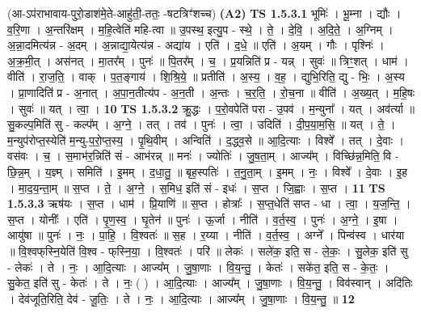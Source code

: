 \documentclass[17pt]{extarticle}
\begin{document}
                  \newline
                      (आ-ऽप॑राभावाय-पुरो॒डाश॑मे॒ते-आहु॑ती॒-ततः॒ -षटत्रिꣳ॑शच्च)  \textbf{(A2)} \newline \newline
                                \textbf{ TS 1.5.3.1} \newline
                  भूमिः॑ । भू॒म्ना । द्यौः । व॒रि॒णा । अ॒न्तरि॑क्षम् । म॒हि॒त्वेति॑ महि-त्वा ॥ उ॒पस्थ॒ इत्यु॒प - स्थे॒ । ते॒ । दे॒वि॒ । अ॒दि॒ते॒ । अ॒ग्निम् । अ॒न्ना॒दमित्य॑न्न - अ॒दम् । अ॒न्नाद्या॒येत्य॑न्न - अद्या॑य । एति॑ । द॒धे॒ ॥ एति॑ । अ॒यम् । गौः । पृश्निः॑ । अ॒क्र॒मी॒त् । अस॑नत् । मा॒तर᳚म् । पुनः॑ ॥ पि॒तर᳚म् । च॒ । प्र॒यन्निति॑ प्र - यन्न् । सुवः॑ ॥ त्रिꣳ॒॒शत् । धाम॑ । वीति॑ । रा॒ज॒ति॒ । वाक् । प॒त॒ङ्गाय॑ । शि॒श्रि॒ये॒ ॥ प्रतीति॑ । अ॒स्य॒ । व॒ह॒ । द्युभि॒रिति॒ द्यु - भिः॒ । अ॒स्य । प्रा॒णादिति॑ प्र - अ॒नात् । अ॒पा॒न॒तीत्य॑प - अ॒न॒ती । अ॒न्तः । च॒र॒ति॒ । रो॒च॒ना ॥ वीति॑ । अ॒ख्य॒त् । म॒हि॒षः । सुवः॑ ॥ यत् । त्वा॒ । \textbf{  10} \newline
                  \newline
                                \textbf{ TS 1.5.3.2} \newline
                  क्रु॒द्धः । प॒रो॒वपेति॑ परा - उ॒पव॑ । म॒न्युना᳚ । यत् । अव॑र्त्या ॥ सु॒कल्प॒मिति॑ सु - कल्प᳚म् । अ॒ग्ने॒ । तत् । तव॑ । पुनः॑ । त्वा॒ । उदिति॑ । दी॒प॒या॒म॒सि॒ ॥ यत् । ते॒ । म॒न्युप॑रोप्त॒स्येति॑ म॒न्यु-प॒रो॒प्त॒स्य॒ । पृ॒थि॒वीम् । अन्विति॑ । द॒द्ध्व॒से ॥ आ॒दि॒त्याः । विश्वे᳚ । तत् । दे॒वाः । वस॑वः । च॒ । स॒माभ॑र॒न्निति॑ सं - आभ॑रन्न् ॥ मनः॑ । ज्योतिः॑ । जु॒ष॒ता॒म् । आज्य᳚म् । विच्छि॑न्न॒मिति॒ वि - छि॒न्न॒म् । य॒ज्ञ्म् । समिति॑ । इ॒मम् । द॒धा॒तु॒ ॥ बृह॒स्पतिः॑ । त॒नु॒ता॒म् । इ॒मम् । नः॒ । विश्वे᳚ । दे॒वाः । इ॒ह । मा॒द॒य॒न्ता॒म् ॥ स॒प्त । ते॒ । अ॒ग्ने॒ । स॒मिध॒ इति॑ सं - इधः॑ । स॒प्त । जि॒ह्वाः । स॒प्त । \textbf{  11} \newline
                  \newline
                                \textbf{ TS 1.5.3.3} \newline
                  ऋष॑यः । स॒प्त । धाम॑ । प्रि॒याणि॑ ॥ स॒प्त । होत्राः᳚ । स॒प्त॒धेति॑ सप्त - धा । त्वा॒ । य॒ज॒न्ति॒ । स॒प्त । योनीः᳚ । एति॑ । पृ॒ण॒स्व॒ । घृ॒तेन॑ ॥ पुनः॑ । ऊ॒र्जा । नीति॑ । व॒र्त॒स्व॒ । पुनः॑ । अ॒ग्ने॒ । इ॒षा । आयु॑षा ॥ पुनः॑ । नः॒ । पा॒हि॒ । वि॒श्वतः॑ ॥ स॒ह । र॒य्या । नीति॑ । व॒र्त॒स्व॒ । अग्ने᳚ । पिन्व॑स्व । धार॑या ॥ वि॒श्वफ्‌स्नि॒येति॑ वि॒श्व - फ्‌स्नि॒या॒ । वि॒श्वतः॑ । परि॑ ॥ लेकः॑ । सले॑क॒ इति॒ स - ले॒कः॒ । सु॒लेक॒ इति॑ सु - लेकः॑ । ते । नः॒ । आ॒दि॒त्याः । आज्य᳚म् । जु॒षा॒णाः । वि॒य॒न्तु॒ । केतः॑ । सके॑त॒ इति॒ स - के॒तः॒ । सु॒केत॒ इति॑ सु - केतः॑ । ते । नः॒ ( ) । आ॒दि॒त्याः । आज्य᳚म् । जु॒षा॒णाः । वि॒य॒न्तु॒ । विव॑स्वान् । अदि॑तिः । देव॑जूति॒रिति॒ देव॑ - जू॒तिः॒ । ते । नः॒ । आ॒दि॒त्याः । आज्य᳚म् । जु॒षा॒णाः । वि॒य॒न्तु॒ ॥ \textbf{  12} \newline
\end{document}

